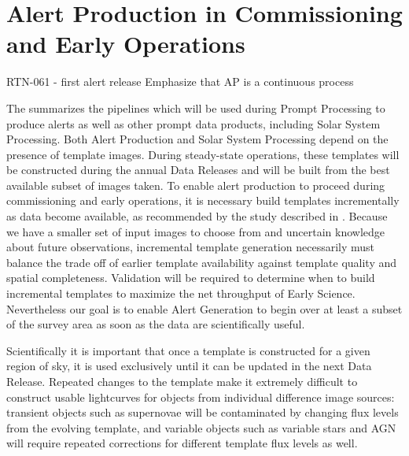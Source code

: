 
%


\section{Alert Production in Commissioning and Early Operations}
\label{sec:pp}


RTN-061 - first alert release 
Emphasize that AP is a continuous process 


The \DPDD{} summarizes the pipelines which will be used during Prompt Processing to produce alerts as well as other prompt data products, including Solar System Processing.
Both Alert Production and Solar System Processing depend on the presence of template images.
During steady-state operations, these templates will be constructed during the annual Data Releases and will be built from the best available subset of images taken.
To enable alert production to proceed during commissioning and early operations, it is necessary build templates incrementally as data become available, as recommended by the study described in .
Because we have a smaller set of input images to choose from and uncertain knowledge about future observations, incremental template generation necessarily must balance the trade off of earlier template availability against template quality and spatial completeness.
Validation will be required to determine when to build incremental templates to maximize the net throughput of Early Science.
Nevertheless our goal is to enable Alert Generation to begin over at least a subset of the survey area as soon as the data are scientifically useful.

Scientifically it is important that once a template is constructed for a given region of sky, it is used exclusively until it can be updated in the next Data Release.
Repeated changes to the template make it extremely difficult to construct usable lightcurves for objects from individual difference image sources: transient objects such as supernovae will be contaminated by changing flux levels from the evolving template, and variable objects such as variable stars and AGN will require repeated corrections for different template flux levels as well.


